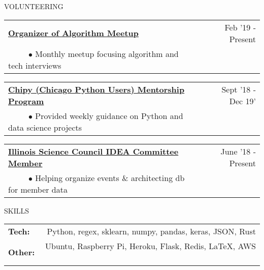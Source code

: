 \documentclass[11pt]{article}
\begin{document}
\vspace {0.8cm}

{VOLUNTEERING}
\vspace {0.4cm}

\begin{tabularx}{\linewidth}{l X r}
\textbf{\href{https://chicagopython.github.io/algosig/}{Organizer of Algorithm Meetup}} & & Feb '19 - Present \\
~~~~~$\bullet$ Monthly meetup focusing algorithm and tech interviews\\

\end{tabularx}

\begin{tabularx}{\linewidth}{l X r}
\textbf{\href{https://chipymentor.org/}{Chipy (Chicago Python Users) Mentorship Program}} & & Sept '18 - Dec 19' \\
~~~~~$\bullet$ Provided weekly guidance on Python and data science projects\\
\end{tabularx}


\begin{tabularx}{\linewidth}{l X r}
\textbf{\href{http://www.illinoisscience.org/about-2/associates-board/}{Illinois Science Council IDEA Committee Member}} & & June '18 - Present \\
~~~~~$\bullet$ Helping organize events \& architecting db for member data\\
\end{tabularx}


\vspace {.8cm}


{SKILLS}
\vspace{0.4cm}

\begin{tabularx}{\linewidth}{X r}
\textbf{Tech:} & Python, regex, sklearn, numpy, pandas, keras, JSON, Rust \\
\textbf{Other:} & Ubuntu, Raspberry Pi, Heroku, Flask, Redis,  \LaTeX, AWS \
\end{tabularx}
\end{document}
